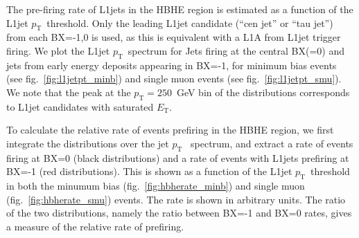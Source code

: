 \documentclass[11pt]{cmspaperpdf}
\newcommand{\pt}{\ensuremath{p_{\textrm{T}}}}
\newcommand{\et}{\ensuremath{E_{\textrm{T}}}}
\begin{document}
The pre-firing rate of L1jets in the HBHE region is estimated as a function of the L1jet \pt~threshold. Only the leading L1jet candidate (``cen jet'' or ``tau jet'') from each BX=-1,0 is used, as this is equivalent with a L1A from L1jet trigger firing. We plot the L1jet \pt~spectrum for Jets firing at the central BX(=0) and jets from early energy deposits appearing in BX=-1, for minimum bias events (see fig.~\ref{fig:l1jetpt_minb}) and single muon events (see fig.~\ref{fig:l1jetpt_smu}). We note that the peak at the $\pt=250$~GeV bin of the distributions corresponds to L1jet candidates with saturated \et. 

To calculate the relative rate of events prefiring in the HBHE region, we first integrate the distributions over the jet \pt~ spectrum, and extract a rate of events firing at BX=0 (black distributions) and a rate of events with L1jets prefiring at BX=-1 (red distributions). This is shown as a function of the L1jet \pt~threshold in both the minumum bias (fig.~\ref{fig:hbherate_minb}) and single muon (fig.~\ref{fig:hbherate_smu}) events. The rate is shown in arbitrary units. The ratio of the two distributions, namely the ratio between BX=-1 and BX=0 rates, gives a measure of the relative rate of prefiring.

\end{document}
